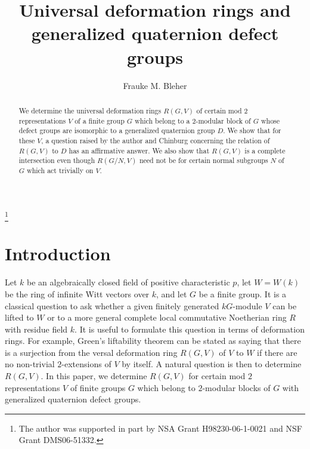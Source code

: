 \documentclass{amsart}
\theoremstyle{plain}
\theoremstyle{definition}
\theoremstyle{remark}
\begin{document}
\title{Universal deformation rings and generalized quaternion defect groups}

\author{Frauke M. Bleher}
\address{Department of Mathematics\\University of Iowa\\
Iowa City, IA 52242-1419}
\thanks{The author was supported in part by  
NSA Grant H98230-06-1-0021 and NSF Grant DMS06-51332.}

\begin{abstract}
We determine the universal deformation rings $R(G,V)$ of certain mod $2$ representations $V$ of
a finite group $G$ 
which belong to a $2$-modular block of $G$ whose defect groups are isomorphic to a generalized
quaternion group $D$.
We show that for these $V$, a question raised by the author and Chinburg concerning 
the relation of $R(G,V)$ to  $D$ has an affirmative answer.  We also show that
$R(G,V)$ is a complete intersection even though $R(G/N,V)$ need not be for certain
normal subgroups $N$ of $G$ which act trivially on $V$.
\end{abstract}

\maketitle

\section{Introduction}
\label{s:intro}
\setcounter{equation}{0}
\setcounter{figure}{0}

Let $k$ be an algebraically closed field of positive characteristic $p$, let $W=W(k)$ be the ring
of infinite Witt vectors over $k$, and let $G$ be a finite group.
It is a classical question to ask whether a given finitely generated $kG$-module $V$ can be lifted
to $W$ or to a more general complete local commutative Noetherian ring $R$ with residue field $k$.
It is useful to formulate this question in terms of deformation rings.  For example, Green's liftability
theorem can be stated as saying that there is a 
surjection from the versal deformation ring $R(G,V)$ of $V$ to $W$ 
if there are no non-trivial $2$-extensions of $V$ by itself. 
A natural question is then to determine $R(G,V)$.
In this paper, we determine $R(G,V)$ for certain mod $2$ representations $V$ of finite groups $G$ 
which belong to $2$-modular blocks of $G$ with generalized quaternion defect groups.
\end{document}
